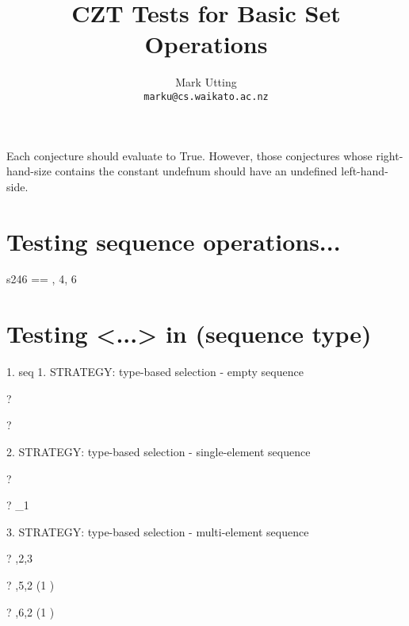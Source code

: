 \documentclass{article}
\title{CZT Tests for Basic Set Operations}
\author{Mark Utting \\ \texttt{marku@cs.waikato.ac.nz}}
\begin{document}
\maketitle

Each conjecture should evaluate to True.
However, those conjectures whose right-hand-size contains
the constant undefnum should have an undefined left-hand-side.


\section{Testing sequence operations...}

\begin{zed}
   s246 == , 4, 6 \rangle
\end{zed}

\section{Testing <...> in (sequence type)}
 1. seq
     1. STRATEGY: type-based selection - empty sequence 
\begin{zed} \vdash? \langle\rangle \in \seq \nat \end{zed}
\begin{zed} \vdash? \langle\rangle \in \seq \emptyset[\nat] \end{zed}
     2. STRATEGY: type-based selection - single-element sequence
\begin{zed} \vdash?  \rangle \in \seq \nat \end{zed}
\begin{zed} \vdash?  \rangle \notin \seq \nat_1 \end{zed}
     3. STRATEGY: type-based selection - multi-element sequence
\begin{zed} \vdash? ,2,3 \rangle \in \seq \nat \end{zed}
\begin{zed} \vdash? ,5,2 \rangle \in \seq (1 ) \end{zed}
\begin{zed} \vdash? ,6,2 \rangle \notin \seq (1 ) \end{zed}
\end{document}
